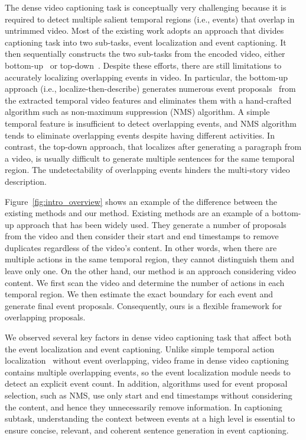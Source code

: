 The dense video captioning task is conceptually very challenging because it is required to detect multiple salient temporal regions (i.e., events) that overlap in untrimmed video.
Most of the existing work adopts an approach that divides captioning task into two sub-tasks, event localization and event captioning.
It then sequentially constructs the two sub-tasks from the encoded video, either bottom-up~\cite{krishna2017dense,li2018jointly,wang2018bidirectional,zhou2018end,mun2019streamlined} or top-down~\cite{deng2021sketch}.
Despite these efforts, there are still limitations to accurately localizing overlapping events in video.
In particular, the bottom-up approach (i.e., localize-then-describe) generates numerous event proposals~\cite{fujita2020soda} from the extracted temporal video features and eliminates them with a hand-crafted algorithm such as non-maximum suppression (NMS) algorithm.
A simple temporal feature is insufficient to detect overlapping events, and NMS algorithm tends to eliminate overlapping events despite having different activities.
In contrast, the top-down approach, that localizes after generating a paragraph from a video, is usually difficult to generate multiple sentences for the same temporal region.
The undetectability of overlapping events hinders the multi-story video description.

Figure~\ref{fig:intro_overview} shows an example of the difference between the existing methods and our method.
Existing methods are an example of a bottom-up approach that has been widely used.
They generate a number of proposals from the video and then consider their start and end timestamps to remove duplicates regardless of the video's content.
In other words, when there are multiple actions in the same temporal region, they cannot distinguish them and leave only one.
On the other hand, our method is an approach considering video content.
We first scan the video and determine the number of actions in each temporal region.
We then estimate the exact boundary for each event and generate final event proposals.
Consequently, ours is a flexible framework for overlapping proposals.

We observed several key factors in dense video captioning task that affect both the event localization and event captioning.
Unlike simple temporal action localization~\cite{yuan2017temporal,lin2018bsn,long2019gaussian,lin2019bmn,zhao2020bottom} without event overlapping, video frame in dense video captioning contains multiple overlapping events, so the event localization module needs to detect an explicit event count.
In addition, algorithms used for event proposal selection, such as NMS, use only start and end timestamps without considering the content, and hence they unnecessarily remove information.
In captioning subtask, understanding the context between events at a high level is essential to ensure concise, relevant, and coherent sentence generation in event captioning.


